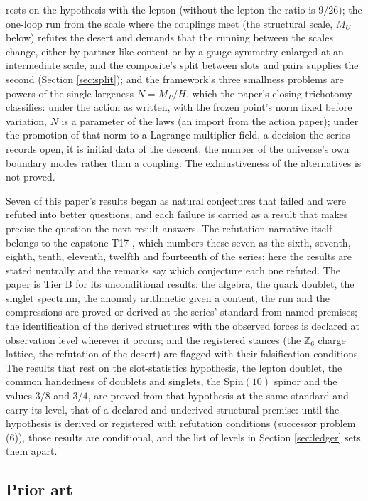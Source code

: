 \documentclass[11pt]{article}
\theoremstyle{definition}
\begin{document}
rests on the hypothesis with the lepton (without the lepton the ratio is $9/26$); the one-loop run from the scale where the couplings meet (the structural scale, $M_{U}$ below) refutes the desert and demands that the running between the scales change, either by partner-like content or by a gauge symmetry enlarged at an intermediate scale, and the composite's split between slots and pairs supplies the second (Section \ref{sec:split}); and the framework's three smallness problems are powers of the single largeness $N = M_{P}/H$, which the paper's closing trichotomy classifies: under the action as written, with the frozen point's norm fixed before variation, $N$ is a parameter of the laws (an import from the action paper); under the promotion of that norm to a Lagrange-multiplier field, a decision the series records open, it is initial data of the descent, the number of the universe's own boundary modes rather than a coupling. The exhaustiveness of the alternatives is not proved.

Seven of this paper's results began as natural conjectures that failed and were refuted into better questions, and each failure is carried as a result that makes precise the question the next result answers. The refutation narrative itself belongs to the capstone T17 \cite{ButlerT17}, which numbers these seven as the sixth, seventh, eighth, tenth, eleventh, twelfth and fourteenth of the series; here the results are stated neutrally and the remarks say which conjecture each one refuted. The paper is Tier B for its unconditional results: the algebra, the quark doublet, the singlet spectrum, the anomaly arithmetic given a content, the run and the compressions are proved or derived at the series' standard from named premises; the identification of the derived structures with the observed forces is declared at observation level wherever it occurs; and the registered stances (the $\mathbb{Z}_{6}$ charge lattice, the refutation of the desert) are flagged with their falsification conditions. The results that rest on the slot-statistics hypothesis, the lepton doublet, the common handedness of doublets and singlets, the $\mathrm{Spin}(10)$ spinor and the values $3/8$ and $3/4$, are proved from that hypothesis at the same standard and carry its level, that of a declared and underived structural premise: until the hypothesis is derived or registered with refutation conditions (successor problem (6)), those results are conditional, and the list of levels in Section \ref{sec:ledger} sets them apart.

\subsection*{Prior art}
\end{document}
